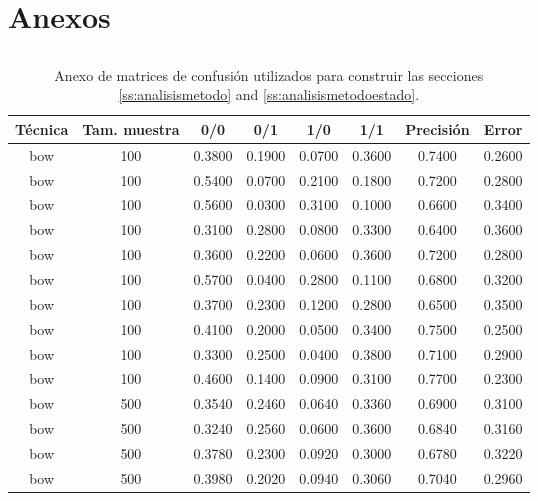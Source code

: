 \chapter*{Anexos}\label{ch:anexos}

\section*{}
\addtocounter{section}{1}
\setcounter{subsection}{0}

\begin{scriptsize}
	\begin{longtable}{cccccccc}
		\caption{Anexo de matrices de confusión utilizados para construir las secciones \ref{ss:analisismetodo} and \ref{ss:analisismetodoestado}.} \\
		\toprule
		\textbf{Técnica} & \textbf{Tam. muestra} & \textbf{0/0} & \textbf{0/1} & \textbf{1/0} & \textbf{1/1} & \textbf{Precisión} & \textbf{Error}\\
		\midrule
		\endhead
		bow      & 100  & 0.3800 & 0.1900 & 0.0700 & 0.3600 & 0.7400 & 0.2600 \\
		bow      & 100  & 0.5400 & 0.0700 & 0.2100 & 0.1800 & 0.7200 & 0.2800 \\
		bow      & 100  & 0.5600 & 0.0300 & 0.3100 & 0.1000 & 0.6600 & 0.3400 \\
		bow      & 100  & 0.3100 & 0.2800 & 0.0800 & 0.3300 & 0.6400 & 0.3600 \\
		bow      & 100  & 0.3600 & 0.2200 & 0.0600 & 0.3600 & 0.7200 & 0.2800 \\
		bow      & 100  & 0.5700 & 0.0400 & 0.2800 & 0.1100 & 0.6800 & 0.3200 \\
		bow      & 100  & 0.3700 & 0.2300 & 0.1200 & 0.2800 & 0.6500 & 0.3500 \\
		bow      & 100  & 0.4100 & 0.2000 & 0.0500 & 0.3400 & 0.7500 & 0.2500 \\
		bow      & 100  & 0.3300 & 0.2500 & 0.0400 & 0.3800 & 0.7100 & 0.2900 \\
		bow      & 100  & 0.4600 & 0.1400 & 0.0900 & 0.3100 & 0.7700 & 0.2300 \\
		bow      & 500  & 0.3540 & 0.2460 & 0.0640 & 0.3360 & 0.6900 & 0.3100 \\
		bow      & 500  & 0.3240 & 0.2560 & 0.0600 & 0.3600 & 0.6840 & 0.3160 \\
		bow      & 500  & 0.3780 & 0.2300 & 0.0920 & 0.3000 & 0.6780 & 0.3220 \\
		bow      & 500  & 0.3980 & 0.2020 & 0.0940 & 0.3060 & 0.7040 & 0.2960 \\

\end{longtable}
\end{scriptsize}
